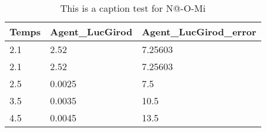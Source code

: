 \begin{table}[h]
	\caption{This is a caption test for N@-O-Mi}\label{tab:This is a label test for N@-O-Mi}
		\begin{tabular}{|l|l|l|}
		\hline
		Temps & Agent_LucGirod & Agent_LucGirod_error\\ \hline
		2.1 & 2.52 & 7.25603\\ \hline
		2.1 & 2.52 & 7.25603\\ \hline
		2.5 & 0.0025 & 7.5\\ \hline
		3.5 & 0.0035 & 10.5\\ \hline
		4.5 & 0.0045 & 13.5\\ \hline
		\hline
	\end{tabular}
\end{table}
